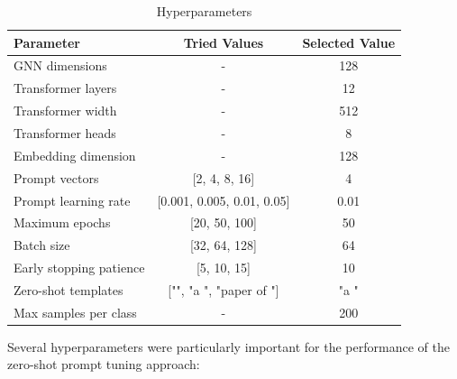 \documentclass[10pt,conference]{IEEEtran}
\begin{document}
\begin{table}[h]
\centering
\caption{Hyperparameters}
\label{tab:hyperparameters}
\begin{tabular}{lcc}
\toprule
\textbf{Parameter} & \textbf{Tried Values} & \textbf{Selected Value} \\
\midrule
GNN dimensions & - & 128 \\
Transformer layers & - & 12 \\
Transformer width & - & 512 \\
Transformer heads & - & 8 \\
Embedding dimension & - & 128 \\
Prompt vectors & [2, 4, 8, 16] & 4 \\
Prompt learning rate & [0.001, 0.005, 0.01, 0.05] & 0.01 \\
Maximum epochs & [20, 50, 100] & 50 \\
Batch size & [32, 64, 128] & 64 \\
Early stopping patience & [5, 10, 15] & 10 \\
Zero-shot templates & ["", "a ", "paper of "] & "a " \\
Max samples per class & - & 200 \\
\bottomrule
\end{tabular}
\end{table}

Several hyperparameters were particularly important for the performance of the zero-shot prompt tuning approach:
\end{document}
